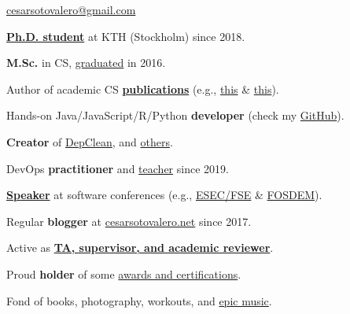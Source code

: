 \documentclass{cesar}
\begin{document}
\ybPrintPhoto{}

{\scshape\bfseries\Large {}}\newline
\href{mailto:cesarsotovalero@gmail.com}{cesarsotovalero@gmail.com}

\vspace{1em}

\textbf{\href{https://www.kth.se/profile/cesarsv}{Ph.D. student}} at KTH (Stockholm) since 2018.

\textbf{M.Sc.} in CS,
  \href{https://www.cesarsotovalero.net/files/certificates/MSc_Degree_(certified)_eng.pdf}{graduated} in 2016.
  
Author of academic CS \textbf{\href{https://www.cesarsotovalero.net/publications}{publications}}
  (e.g., \href{https://dx.doi.org/10.1007/s10664-020-09914-8}{this} \& \href{https://dx.doi.org/10.1109/MSR.2019.00059}{this}).


Hands-on Java/JavaScript/R/Python \textbf{developer}
  (check my \href{https://github.com/cesarsotovalero}{GitHub}).

\textbf{Creator} of \href{https://github.com/castor-software/depclean}{DepClean}, and
  \href{https://www.cesarsotovalero.net/software}{others}.
  
DevOps \textbf{practitioner} and \href{https://github.com/KTH/devops-course}{teacher} since 2019.
  
\textbf{\href{https://www.cesarsotovalero.net/talks}{Speaker}}
  at software conferences (e.g.,
  \href{https://youtu.be/cePEl485E_s}{ESEC/FSE} \&
  \href{https://youtu.be/8SndbPMwdWE}{FOSDEM}).
  
Regular \textbf{blogger} at \href{https://www.cesarsotovalero.net/}{cesarsotovalero.net} since 2017.

Active as \textbf{\href{https://www.cesarsotovalero.net/service}{TA, supervisor, and academic reviewer}}. 

Proud \textbf{holder} of some \href{https://www.cesarsotovalero.net/certifications.html}{awards and certifications}.


Fond of
  books,
  photography,
  workouts,
  and
  \href{https://open.spotify.com/playlist/1E4xBA3IYuTjtTphOV16FM}{epic music}.
\end{document}
